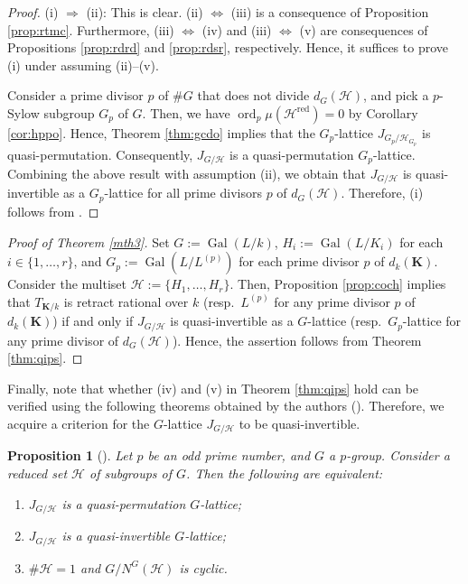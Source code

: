 \documentclass[12pt]{amsart}
\theoremstyle{plain}
\newtheorem{prop}[thm]{Proposition}
\theoremstyle{definition}
\numberwithin{thm}{section}
\numberwithin{equation}{section}
\newcommand{\bK}{\mathbf{K}}
\newcommand{\cH}{\mathcal{H}}
\DeclareMathOperator{\ord}{ord}
\DeclareMathOperator{\Gal}{Gal}
\DeclareMathOperator{\red}{red}
\begin{document}
\begin{proof}
(i) $\Rightarrow$ (ii): This is clear. (ii) $\Leftrightarrow$ (iii) is a consequence of Proposition \ref{prop:rtmc}. Furthermore, (iii) $\Leftrightarrow$ (iv) and (iii) $\Leftrightarrow$ (v) are consequences of Propositions \ref{prop:rdrd} and \ref{prop:rdsr}, respectively. Hence, it suffices to prove (i) under assuming (ii)--(v). 

Consider a prime divisor $p$ of $\#G$ that does not divide $d_{G}(\cH)$, and pick a $p$-Sylow subgroup $G_{p}$ of $G$. Then, we have $\ord_{p}\mu(\cH^{\red})=0$ by Corollary \ref{cor:hppo}. Hence, Theorem \ref{thm:gcdo} implies that the $G_{p}$-lattice $J_{G_{p}/\cH_{G_{p}}}$ is quasi-permutation. Consequently, $J_{G/\cH}$ is a quasi-permutation $G_{p}$-lattice. Combining the above result with assumption (ii), we obtain that $J_{G/\cH}$ is quasi-invertible as a $G_{p}$-lattice for all prime divisors $p$ of $d_{G}(\cH)$. Therefore, (i) follows from  \cite[Corollary 1.6]{Endo2011}. 
\end{proof}

\begin{proof}[Proof of Theorem \ref{mth3}]
Set $G:=\Gal(L/k)$, $H_{i}:=\Gal(L/K_{i})$ for each $i\in \{1,\ldots,r\}$, and $G_{p}:=\Gal(L/L^{(p)})$ for each prime divisor $p$ of $d_{k}(\bK)$. Consider the multiset $\cH:=\{H_{1},\ldots,H_{r}\}$. Then, Proposition \ref{prop:coch} implies that $T_{\bK/k}$ is retract rational over $k$ (resp.~$L^{(p)}$ for any prime divisor $p$ of $d_{k}(\bK)$) if and only if $J_{G/\cH}$ is quasi-invertible as a $G$-lattice (resp.~$G_{p}$-lattice for any prime divisor of $d_{G}(\cH)$). Hence, the assertion follows from Theorem \ref{thm:qips}. 
\end{proof}

Finally, note that whether (iv) and (v) in Theorem \ref{thm:qips} hold can be verified using the following theorems obtained by the authors (\cite{Hasegawa}). Therefore, we acquire a criterion for the $G$-lattice $J_{G/\cH}$ to be quasi-invertible. 

\begin{prop}[{\cite[Theorem 5.10]{Hasegawa}}]\label{prop:odqp}
Let $p$ be an odd prime number, and $G$ a $p$-group. Consider a reduced set $\cH$ of subgroups of $G$. Then the following are equivalent: 
\begin{enumerate}
    \item $J_{G/\cH}$ is a quasi-permutation $G$-lattice; 
    \item $J_{G/\cH}$ is a quasi-invertible $G$-lattice; 
    \item $\#\cH=1$ and $G/N^{G}(\cH)$ is cyclic. 
\end{enumerate}
\end{prop}
\end{document}
